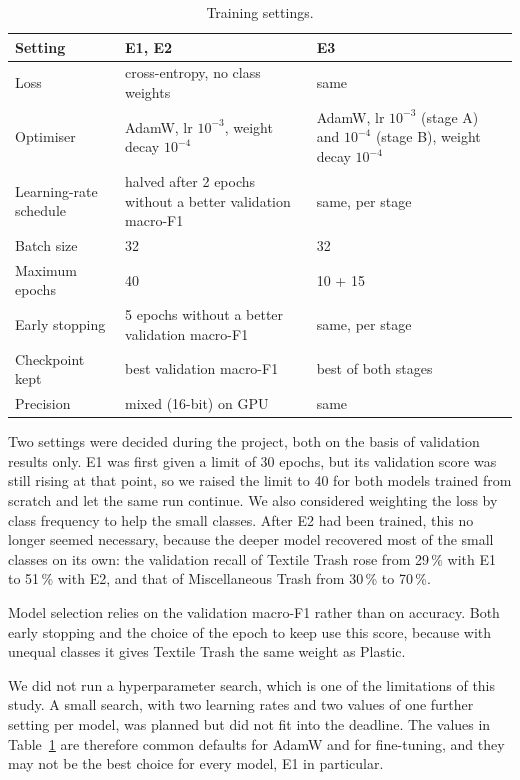 \documentclass{article}
\begin{document}
\begin{table}[H]
\centering
\caption{Training settings.}
\label{tab:train}
\begin{tabularx}{\textwidth}{lXX}
\toprule
Setting & E1, E2 & E3 \\
\midrule
Loss & cross-entropy, no class weights & same \\
Optimiser & AdamW, lr $10^{-3}$, weight decay $10^{-4}$ & AdamW, lr $10^{-3}$ (stage A) and $10^{-4}$ (stage B), weight decay $10^{-4}$ \\
Learning-rate schedule & halved after 2 epochs without a better validation macro-F1 & same, per stage \\
Batch size & 32 & 32 \\
Maximum epochs & 40 & 10 + 15 \\
Early stopping & 5 epochs without a better validation macro-F1 & same, per stage \\
Checkpoint kept & best validation macro-F1 & best of both stages \\
Precision & mixed (16-bit) on GPU & same \\
\bottomrule
\end{tabularx}
\end{table}

Two settings were decided during the project, both on the basis of validation results only. E1 was first given a limit of 30 epochs, but its validation score was still rising at that point, so we raised the limit to 40 for both models trained from scratch and let the same run continue. We also considered weighting the loss by class frequency to help the small classes. After E2 had been trained, this no longer seemed necessary, because the deeper model recovered most of the small classes on its own: the validation recall of Textile Trash rose from 29\,\% with E1 to 51\,\% with E2, and that of Miscellaneous Trash from 30\,\% to 70\,\%.

Model selection relies on the validation macro-F1 rather than on accuracy. Both early stopping and the choice of the epoch to keep use this score, because with unequal classes it gives Textile Trash the same weight as Plastic.

We did not run a hyperparameter search, which is one of the limitations of this study. A small search, with two learning rates and two values of one further setting per model, was planned but did not fit into the deadline. The values in Table~\ref{tab:train} are therefore common defaults for AdamW and for fine-tuning, and they may not be the best choice for every model, E1 in particular.
\end{document}
